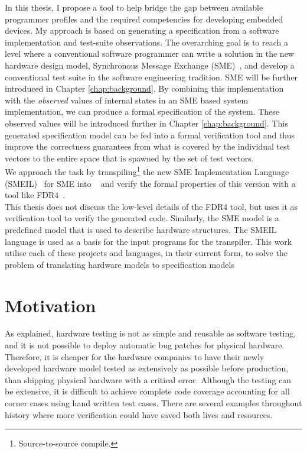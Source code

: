 In this thesis, I propose a tool to help bridge the gap between available programmer profiles and the required competencies for developing embedded devices. My approach is based on generating a specification from a software implementation and test-suite observations. The overarching goal is to reach a level where a conventional software programmer can write a solution in the new hardware design model, Synchronous Message Exchange (SME)~\cite{Vinter2014, Vinter2015, Skovhede}, and develop a conventional test suite in the software engineering tradition. SME will be further introduced in Chapter \ref{chap:background}. By combining this implementation with the \emph{observed} values of internal states in an SME based system implementation, we can produce a formal specification of the system. These observed values will be introduced further in Chapter \ref{chap:background}.
This generated specification model can be fed into a formal verification tool and thus improve the correctness guarantees from what is covered by the individual test vectors to the entire space that is spawned by the set of test vectors.\\

We approach the task by transpiling\footnote{Source-to-source compile.} the new SME Implementation Language (SMEIL)~\cite{smeil} for SME into \cspm{}~\cite{Scattergood1998} and verify the formal properties of this version with a tool like FDR4~\cite{fdr}.\\

This thesis does not discuss the low-level details of the FDR4 tool, but uses it as verification tool to verify the generated \cspm{} code.
Similarly, the SME model is a predefined model that is used to describe hardware structures. The SMEIL language is used as a basis for the input programs for the transpiler. This work utilise each of these projects and languages, in their current form, to solve the problem of translating hardware models to specification models
\section{Motivation}
As explained, hardware testing is not as simple and reusable as software testing, and it is not possible to deploy automatic bug patches for physical hardware. Therefore, it is cheaper for the hardware companies to have their newly developed hardware model tested as extensively as possible before production, than shipping physical hardware with a critical error. Although the testing can be extensive, it is difficult to achieve complete code coverage accounting for all corner cases using hand written test cases. There are several examples throughout history where more verification could have saved both lives and resources.
